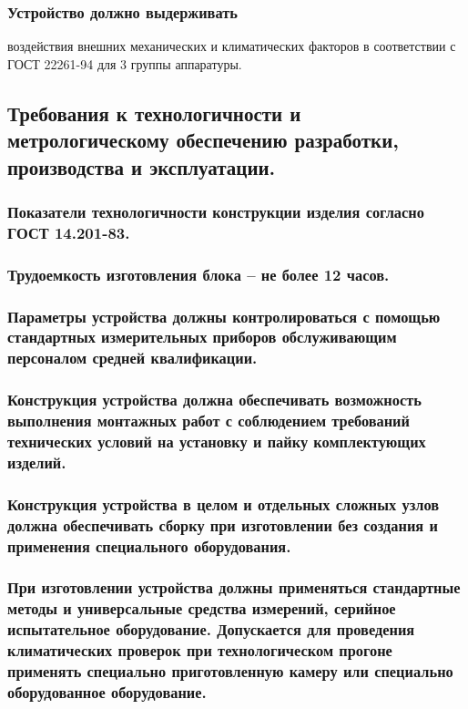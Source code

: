 \documentclass[a4paper]{bsuir-tor}
\begin{document}
 \subsubsection{Устройство должно выдерживать}
 воздействия внешних
 механических и климатических факторов в соответствии с ГОСТ 22261-94
 для 3 группы аппаратуры.

 \subsection{Требования к технологичности и
   метрологическому обеспечению разработки,
   производства и эксплуатации.}

 \subsubsection{Показатели технологичности конструкции изделия согласно ГОСТ 14.201-83.}
 
 \subsubsection{Трудоемкость изготовления блока – не более 12 часов.}
 
 \subsubsection{Параметры устройства должны контролироваться с
   помощью стандартных измерительных приборов
   обслуживающим персоналом средней квалификации.}

 \subsubsection{Конструкция устройства
   должна обеспечивать возможность
   выполнения монтажных работ
   с соблюдением требований технических условий
   на установку и пайку комплектующих изделий.}

 \subsubsection{Конструкция устройства в целом
   и отдельных сложных узлов
   должна обеспечивать сборку при изготовлении без создания и применения
   специального оборудования.}

 \subsubsection {При изготовлении устройства должны применяться стандартные
   методы и универсальные средства измерений,
   серийное испытательное оборудование.
   Допускается для проведения климатических проверок
   при технологическом прогоне применять специально
   приготовленную камеру или специально оборудованное оборудование.}
\end{document}
